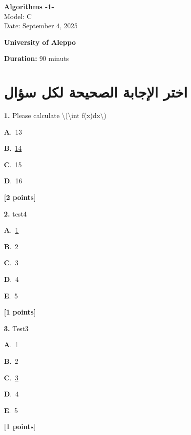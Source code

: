\documentclass[12pt]{article}
\newcommand{\choice}[3]{%
  \noindent\textbf{#1}.~#2\hfill#3\par\vspace{0.25em}
}
\begin{document}
\begin{flushright}
{\Large \textbf{{\textenglish{Algorithms -1-}}}}\\[0.25em]
{\normalsize \textenglish{Model: }{\textenglish{C}}}\\[0.1em]
{\normalsize \textenglish{Date: }{\textenglish{September 4, 2025}}}
\end{flushright}

\vspace{0.6cm}

\noindent
\begin{minipage}[t]{0.65\textwidth}
  \raggedright
  \textbf{{\textenglish{University of Aleppo}}}\\[0.3em]
\end{minipage}\hfill
\begin{minipage}[t]{0.3\textwidth}
  \raggedleft
  \textenglish{\textbf{Duration: }}{\textenglish{90 minuts}}
\end{minipage}

\vspace{0.9cm}

\section*{اختر الإجابة الصحيحة لكل سؤال}

\noindent \textbf{\textenglish{1.}} {\textenglish{Please calculate \textbackslash{}(\textbackslash{}int f(x)dx\textbackslash{})}}

\noindent\choice{A}{{\textenglish{13}}}{}
\noindent\choice{B}{\underline{{\textenglish{14}}}}{}
\noindent\choice{C}{{\textenglish{15}}}{}
\noindent\choice{D}{{\textenglish{16}}}{}
\hfill \textbf{[2 points]}\vspace{0.5em}

\noindent \textbf{\textenglish{2.}} {\textenglish{test4}}

\noindent\choice{A}{\underline{{\textenglish{1}}}}{}
\noindent\choice{B}{{\textenglish{2}}}{}
\noindent\choice{C}{{\textenglish{3}}}{}
\noindent\choice{D}{{\textenglish{4}}}{}
\noindent\choice{E}{{\textenglish{5}}}{}
\hfill \textbf{[1 points]}\vspace{0.5em}

\noindent \textbf{\textenglish{3.}} {\textenglish{Test3}}

\noindent\choice{A}{{\textenglish{1}}}{}
\noindent\choice{B}{{\textenglish{2}}}{}
\noindent\choice{C}{\underline{{\textenglish{3}}}}{}
\noindent\choice{D}{{\textenglish{4}}}{}
\noindent\choice{E}{{\textenglish{5}}}{}
\hfill \textbf{[1 points]}\vspace{0.5em}
\end{document}
